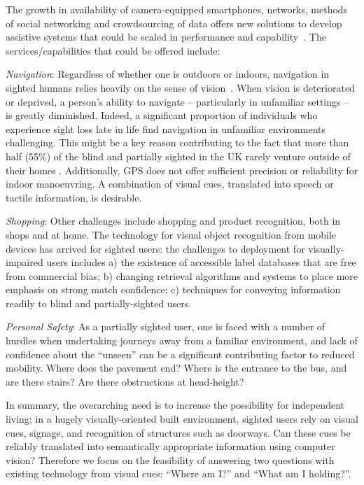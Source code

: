 The growth in availability of camera-equipped smartphones, networks, methods of social networking and crowdsourcing of data offers new solutions to develop assistive systems that could be scaled in performance and capability~\cite{Manduchi2012,Worsfold2010}. The services/capabilities that could be offered include:

\emph{Navigation}: Regardless of whether one is outdoors or indoors, navigation in sighted humans relies heavily on the sense of vision~\citep{kalia2008learning,tsuji2005landmarks}. When vision is deteriorated or deprived, a person's ability to navigate -- particularly in unfamiliar settings -- is greatly diminished. Indeed, a significant proportion of individuals who experience sight loss late in life find navigation in unfamiliar environments challenging. This might be a key reason contributing to the fact that more than half (55\%) of the blind and partially sighted in the UK rarely venture outside of their homes \citep{Worsfold2010}. Additionally, GPS does not offer sufficient precision or reliability for indoor manoeuvring. A combination of visual cues, translated into speech or tactile information, is desirable.

\emph{Shopping}: Other challenges include shopping and product recognition, both in shops and at home. The technology for visual object recognition from mobile devices has arrived for sighted users: the challenges to deployment for visually-impaired users includes a) the existence of accessible label databases that are free from commercial bias; b) changing retrieval algorithms and systems to place more emphasis on strong match confidence; c) techniques for conveying information readily to blind and partially-sighted users.

\emph{Personal Safety}: As a partially sighted user, one is faced with a number of hurdles when undertaking journeys away from a familiar environment, and lack of confidence about the ``unseen'' can be a significant contributing factor to reduced mobility.  Where does the pavement end?  Where is the entrance to the bus, and are there stairs?  Are there obstructions at head-height?   

In summary, the overarching need is to increase the possibility for independent living; in a hugely visually-oriented built environment, sighted users rely on visual cues, signage, and recognition of structures such as doorways.  Can these cues be reliably translated into semantically appropriate information using computer vision? Therefore we focus on the feasibility of answering two questions with existing technology from visual cues: ``Where am I?'' and ``What am I holding?''. 

